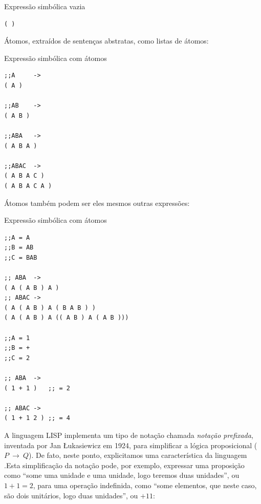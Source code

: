\begin{example}{Expressão simbólica vazia}\label{ex:s-expression}
\begin{verbatim}
( )
\end{verbatim}
\end{example}

Átomos, extraídos de sentenças abstratas, como listas de átomos:

\begin{example}{Expressão simbólica com átomos}\label{ex:s-expression2}
\begin{verbatim}
;;A     -> 
( A )

;;AB    -> 
( A B )

;;ABA   ->
( A B A )

;;ABAC  ->
( A B A C )
( A B A C A )
\end{verbatim}
\end{example}

Átomos também podem ser eles mesmos outras expressões:

\begin{example}{Expressão simbólica com átomos}\label{ex:s-expression3}
\begin{verbatim}
;;A = A
;;B = AB
;;C = BAB

;; ABA  -> 
( A ( A B ) A )
;; ABAC ->
( A ( A B ) A ( B A B ) )
( A ( A B ) A (( A B ) A ( A B )))

;;A = 1
;;B = +
;;C = 2

;; ABA  -> 
( 1 + 1 )   ;; = 2

;; ABAC -> 
( 1 + 1 2 ) ;; = 4
\end{verbatim}
\end{example}

A linguagem LISP implementa um tipo de notação chamada \emph{notação prefixada}, inventada por Jan Łukasiewicz em 1924, para simplificar a lógica proposicional ($P~\to~Q$). De fato, neste ponto, explicitamos uma característica da linguagem .Esta simplificação da notação pode, por exemplo, expressar uma proposição como  ``some uma unidade e uma unidade, logo teremos duas unidades'',  ou $1+1=2$, para uma operação indefinida, como ``some elementos, que neste caso, são dois unitários, logo duas unidades'', ou $+ 1 1$:

